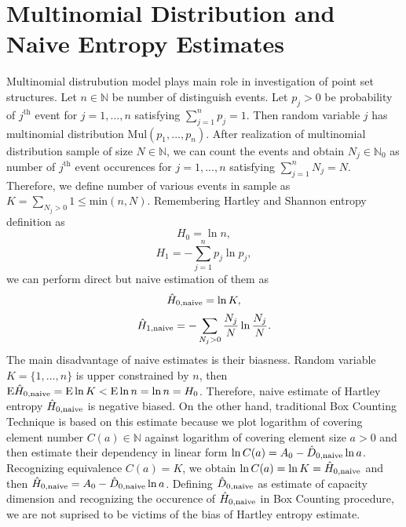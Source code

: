 \section {Multinomial Distribution and Naive Entropy Estimates}

Multinomial distrubution model plays main role in investigation of point set structures. Let $n \in \mathbb{N}$ be number of distinguish events. Let $p_{j} > 0$ be probability of $j^{\text{th}}$ event for $j = 1,...,n$ satisfying $ \sum_{j=1}^{n} p_{j} =1$. Then random variable $j$ has multinomial distribution $\text{Mul}(p_{1},...,p_{n})$. After realization of multinomial distribution sample of size $N \in \mathbb{N}$, we can count the events and obtain $N_{j} \in \mathbb{N}_{0}$ as number of $j^{\text{th}}$ event occurences for $j=1,...,n$ satisfying $\sum_{j=1}^{n} N_{j} = N$. Therefore, we define number of various events in sample as $K = \sum_{N_{j}>0} 1 \le \text{min}(n,N)$. Remembering Hartley and Shannon entropy definition as
\begin{equation} 
\label{eq:hnula}
H_{0}=\ln{n},
\end{equation} 
\begin{equation} 
\label{eq:hjedna}
H_{1}=-\sum_{j=1}^{n} p_{j}\ln{p_{j}},
\end{equation}   
we can perform direct but naive estimation of them as
\begin{equation} 
\label{eq:hnulaap}
\hat{H}_{0,\mbox{\scriptsize{naive}}}=\ln{K},
\end{equation} 
\begin{equation} 
\label{eq:hjednaap}
\hat{H}_{1,\mbox{\scriptsize{naive}}}=-\sum_{N_{j}>0} \frac{N_{j}}{N}\ln{\frac{N_{j}}{N}}.
\end{equation}   
The main disadvantage of naive estimates is their biasness. Random variable $K= \{ 1,...,n \} $ is upper constrained by $n$, then $\text{E}\hat{H}_{0,\mbox{\scriptsize{naive}}} = \text{E}\ln{K} < \text{E}\ln{n} = \ln{n} = H_{0}$. Therefore, naive estimate of Hartley entropy $\hat{H}_{0,\mbox{\scriptsize{naive}}}$ is negative biased. On the other hand, traditional Box Counting Technique is based on this estimate because we plot logarithm of covering element number $C(a) \in \mathbb{N}$ against logarithm of covering element size $a > 0$ and then estimate their dependency in linear form $\ln{C(a)} = A_{0} - \hat{D}_{0,\mbox{\scriptsize{naive}}}\ln{a}$. Recognizing equivalence $C(a) = K$, we obtain $\ln{C(a)} = \ln{K} = \hat{H}_{0,\mbox{\scriptsize{naive}}}$ and then $\hat{H}_{0,\mbox{\scriptsize{naive}}} = A_{0} - \hat{D}_{0,\mbox{\scriptsize{naive}}}\ln{a}$. Defining $\hat{D}_{0,\mbox{\scriptsize{naive}}}$ as estimate of capacity dimension and recognizing the occurence of $\hat{H}_{0,\mbox{\scriptsize{naive}}}$ in Box Counting procedure, we are not suprised to be victims of the bias of Hartley entropy estimate.\\ 
